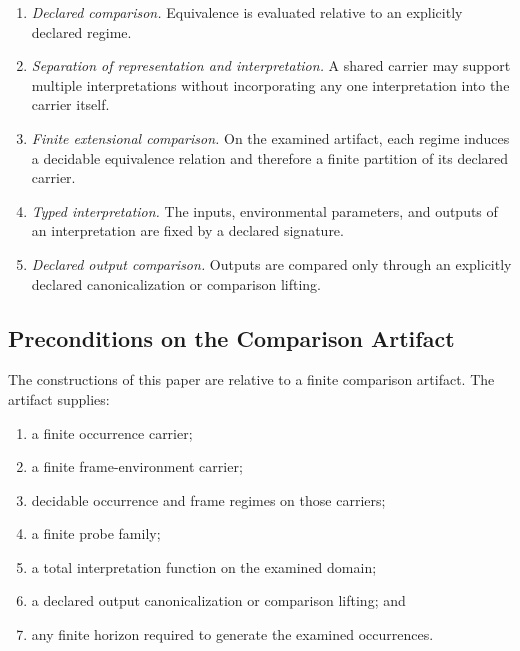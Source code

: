 \documentclass[11pt]{article}
\theoremstyle{plain}
\theoremstyle{definition}
\theoremstyle{remark}
\begin{document}
\begin{enumerate}[label=(I\arabic*)]
  \item \emph{Declared comparison.}
        Equivalence is evaluated relative to an explicitly declared regime.

  \item \emph{Separation of representation and interpretation.}
        A shared carrier may support multiple interpretations
        without incorporating any one interpretation into the carrier itself.

  \item \emph{Finite extensional comparison.}
        On the examined artifact,
        each regime induces a decidable equivalence relation
        and therefore a finite partition of its declared carrier.

  \item \emph{Typed interpretation.}
        The inputs,
        environmental parameters,
        and outputs of an interpretation are fixed by a declared signature.

  \item \emph{Declared output comparison.}
        Outputs are compared only through an explicitly declared
        canonicalization or comparison lifting.
\end{enumerate}

\subsection{Preconditions on the Comparison Artifact}

The constructions of this paper are relative to a finite comparison artifact.
The artifact supplies:

\begin{enumerate}[label=(P\arabic*)]
  \item a finite occurrence carrier;
  \item a finite frame-environment carrier;
  \item decidable occurrence and frame regimes on those carriers;
  \item a finite probe family;
  \item a total interpretation function on the examined domain;
  \item a declared output canonicalization or comparison lifting; and
  \item any finite horizon required to generate the examined occurrences.
\end{enumerate}
\end{document}
